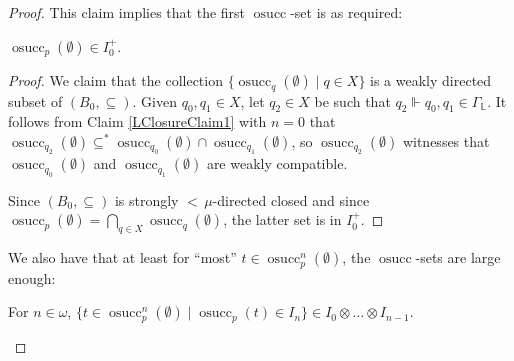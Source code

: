 \documentclass[10pt,a4paper]{amsart}
\DeclareMathOperator{\osucc}{osucc}
\newcommand{\dL}{\mathbb{L}}
\begin{document}
\begin{proof}
		This claim implies that the first $\osucc$-set is as required:
		
		\begin{myclaim}\label{LClosureClaim2}
			$\osucc_p(\emptyset)\in I_0^+$.
		\end{myclaim}
		
		\begin{proof}
			We claim that the collection $\{\osucc_q(\emptyset)\;|\;q\in X\}$ is a weakly directed subset of $(B_0,\subseteq)$. Given $q_0,q_1\in X$, let $q_2\in X$ be such that $q_2\Vdash q_0,q_1\in\Gamma_{\dL}$. It follows from Claim \ref{LClosureClaim1} with $n=0$ that $\osucc_{q_2}(\emptyset)\subseteq^*\osucc_{q_0}(\emptyset)\cap\osucc_{q_1}(\emptyset)$, so $\osucc_{q_2}(\emptyset)$ witnesses that $\osucc_{q_0}(\emptyset)$ and $\osucc_{q_1}(\emptyset)$ are weakly compatible.
			
			Since $(B_0,\subseteq)$ is strongly ${<}\,\mu$-directed closed and since $\osucc_p(\emptyset)=\bigcap_{q\in X}\osucc_q(\emptyset)$, the latter set is in $I_0^+$.
		\end{proof}
		
		We also have that at least for ``most'' $t\in\osucc_p^n(\emptyset)$, the $\osucc$-sets are large enough:
		
		\begin{myclaim}\label{LClosureClaim3}
			For $n\in\omega$, $\{t\in\osucc_p^n(\emptyset)\;|\;\osucc_p(t)\in I_n\}\in I_0\otimes\dots\otimes I_{n-1}$.
		\end{myclaim}
		

\end{proof}
\end{document}
